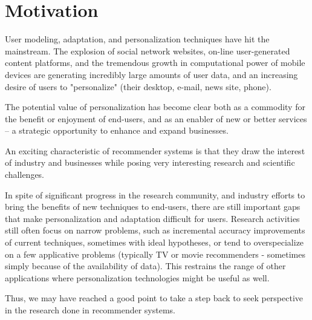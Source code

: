 \section{Motivation}

 User modeling, adaptation, and personalization techniques have hit the mainstream. The explosion of social network websites, on-line user-generated content platforms, and the tremendous growth in computational power of mobile devices are generating incredibly large amounts of user data, and an increasing desire of users to "personalize" (their desktop, e-mail, news site, phone).

 The potential value of personalization has become clear both as a commodity for the benefit or enjoyment of end-users, and as an enabler of new or better services – a strategic opportunity to enhance and expand businesses.

 An exciting characteristic of recommender systems is that they draw the interest of industry and businesses while posing very interesting research and scientific challenges.

 In spite of significant progress in the research community, and industry efforts to bring the benefits of new techniques to end-users, there are still important gaps that make personalization and adaptation difficult for users. Research activities still often focus on narrow problems, such as incremental accuracy improvements of current techniques, sometimes with ideal hypotheses, or tend to overspecialize on a few applicative problems (typically TV or movie recommenders - sometimes simply because of the availability of data). This restrains the range of other applications where personalization technologies might be useful as well.

 Thus, we may have reached a good point to take a step back to seek perspective in the research done in recommender systems.